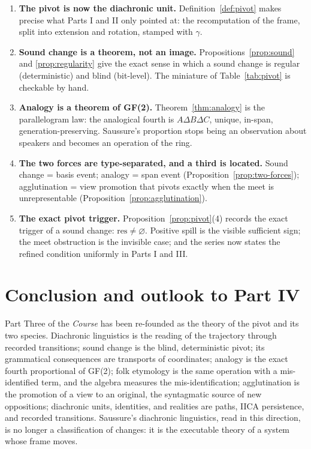 \documentclass[11pt,a4paper]{article}
\theoremstyle{remark}
\newcommand{\xor}{\ensuremath{\Delta}}                   %
\newcommand{\res}{\ensuremath{\mathrm{res}}}             %
\newcommand{\Gen}{\ensuremath{\gamma}}                   %
\begin{document}
\begin{enumerate}[leftmargin=*,nosep]
  \item \textbf{The pivot is now the diachronic unit.} Definition~\ref{def:pivot}
    makes precise what Parts I and II only pointed at: the recomputation of
    the frame, split into extension and rotation, stamped with $\Gen$.
  \item \textbf{Sound change is a theorem, not an image.}
    Propositions~\ref{prop:sound} and \ref{prop:regularity} give the exact
    sense in which a sound change is regular (deterministic) and blind
    (bit-level). The miniature of Table~\ref{tab:pivot} is checkable by hand.
  \item \textbf{Analogy is a theorem of GF(2).} Theorem~\ref{thm:analogy} is
    the parallelogram law: the analogical fourth is $A \xor B \xor C$, unique,
    in-span, generation-preserving. Saussure's proportion stops being an
    observation about speakers and becomes an operation of the ring.
  \item \textbf{The two forces are type-separated, and a third is located.}
    Sound change = basis event; analogy = span event
    (Proposition~\ref{prop:two-forces}); agglutination = view promotion that
    pivots exactly when the meet is unrepresentable
    (Proposition~\ref{prop:agglutination}).
  \item \textbf{The exact pivot trigger.} Proposition~\ref{prop:pivot}(4)
    records the exact trigger of a sound change: $\res \neq \varnothing$.
    Positive spill is the visible sufficient sign; the meet obstruction is
    the invisible case; and the series now states the refined condition
    uniformly in Parts I and III.
\end{enumerate}

\section{Conclusion and outlook to Part IV}
\label{sec:conclusion}

Part Three of the \textit{Course} has been re-founded as the theory of the
pivot and its two species. Diachronic linguistics is the reading of the
trajectory through recorded transitions; sound change is the blind,
deterministic pivot; its grammatical consequences are transports of
coordinates; analogy is the exact fourth proportional of GF(2); folk
etymology is the same operation with a mis-identified term, and the algebra
measures the mis-identification; agglutination is the promotion of a view to
an original, the syntagmatic source of new oppositions; diachronic units,
identities, and realities are paths, IICA persistence, and recorded
transitions. Saussure's diachronic linguistics, read in this direction, is no
longer a classification of changes: it is the executable theory of a system
whose frame moves.
\end{document}
